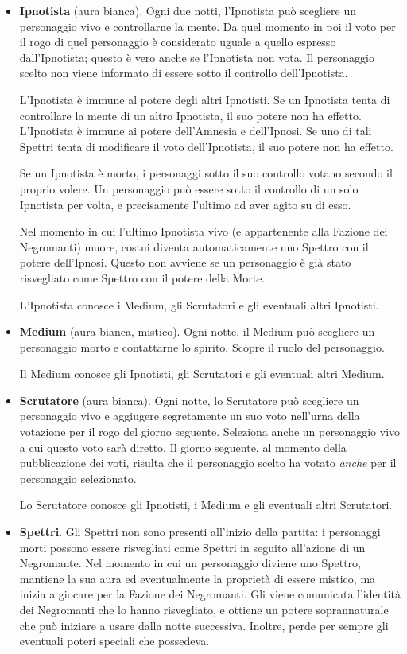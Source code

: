 \documentclass[a4paper,10pt]{article}
\begin{document}
\begin{itemize}
 \item {\bf Ipnotista} (aura bianca). Ogni due notti, l'Ipnotista può scegliere un personaggio vivo e controllarne la mente. Da quel momento in poi il voto per il rogo di quel personaggio è considerato uguale a quello espresso dall'Ipnotista; questo è vero anche se l'Ipnotista non vota.
 Il personaggio scelto non viene informato di essere sotto il controllo dell'Ipnotista.
 
 L'Ipnotista è immune al potere degli altri Ipnotisti. Se un Ipnotista tenta di controllare la mente di un altro Ipnotista, il suo potere non ha effetto.
 L'Ipnotista è immune ai potere dell'Amnesia e dell'Ipnosi. Se uno di tali Spettri tenta di modificare il voto dell'Ipnotista, il suo potere non ha effetto.

 Se un Ipnotista è morto, i personaggi sotto il suo controllo votano secondo il proprio volere.
 Un personaggio può essere sotto il controllo di un solo Ipnotista per volta, e precisamente l'ultimo ad aver agito su di esso.

Nel momento in cui l'ultimo Ipnotista vivo (e appartenente alla Fazione dei Negromanti) muore, costui diventa automaticamente uno Spettro con il potere dell'Ipnosi. Questo non avviene se un personaggio è già stato risvegliato come Spettro con il potere della Morte.

 L'Ipnotista conosce i Medium, gli Scrutatori e gli eventuali altri Ipnotisti.

 \item {\bf Medium} (aura bianca, mistico). Ogni notte, il Medium può scegliere un personaggio morto e contattarne lo spirito. Scopre il ruolo del personaggio.

 Il Medium conosce gli Ipnotisti, gli Scrutatori e gli eventuali altri Medium.
 
 \item {\bf Scrutatore} (aura bianca). Ogni notte, lo Scrutatore può scegliere  un personaggio vivo e aggiugere segretamente un suo voto nell'urna della votazione per il rogo  del giorno seguente. Seleziona anche un personaggio vivo a cui questo voto sarà diretto. Il giorno seguente, al momento della pubblicazione dei voti, risulta che il personaggio scelto ha votato \emph{anche} per il personaggio selezionato.
 
 Lo Scrutatore conosce gli Ipnotisti, i Medium e gli eventuali altri Scrutatori.

 \item {\bf Spettri}. Gli Spettri non sono presenti all'inizio della partita: i personaggi morti possono essere risvegliati come Spettri in seguito all'azione di un Negromante.
 Nel momento in cui un personaggio diviene uno Spettro, mantiene la sua aura ed eventualmente la proprietà di essere mistico, ma inizia a giocare per la Fazione dei Negromanti. Gli viene comunicata l'identità dei Negromanti che lo hanno risvegliato, e ottiene un potere soprannaturale che può iniziare a usare dalla notte successiva. Inoltre, perde per sempre gli eventuali poteri speciali che possedeva.
 

\end{itemize}
\end{document}
